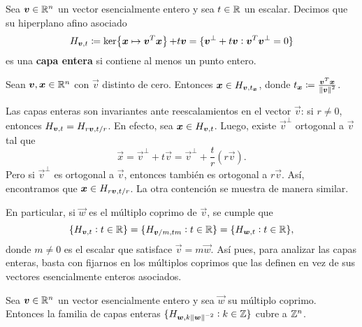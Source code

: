 \begin{definition}
	\label{phase-1:def:c-layer}
	Sea $\boldsymbol{v} \in \mathbb{R}^n$ un vector esencialmente entero y sea $t \in \mathbb{R}$ un escalar. Decimos que
	su hiperplano afino asociado
	\begin{equation}
		\label{phase-1:def:affine-hyperplane}
		H_{\boldsymbol{v}, t} \coloneq \mathop{\mathrm{ker}{\left\lbrace \boldsymbol{x} \mapsto \boldsymbol{v}^T\boldsymbol{x} \right\rbrace}} + t\boldsymbol{v}
		= \lbrace \boldsymbol{v}^{\perp} + t\boldsymbol{v} \vcentcolon \boldsymbol{v}^T\boldsymbol{v}^{\perp} = 0 \rbrace
	\end{equation}
	es una \textbf{capa entera} si contiene al menos un punto entero.
\end{definition}

\begin{lemma}
	\label{phase-1:lemma:layer}
	Sean $\boldsymbol{v}, \boldsymbol{x} \in \mathbb{R}^n$ con $\vec{v}$ distinto de cero. Entonces $\boldsymbol{x} \in
	H_{\boldsymbol{v}, t_{\boldsymbol{x}}}$, donde $t_{\boldsymbol{x}} \coloneq
	\frac{\boldsymbol{v}^T\boldsymbol{x}}{\left\lVert \boldsymbol{v} \right\rVert^2}$.
\end{lemma}

Las capas enteras son invariantes ante reescalamientos en el vector $\vec{v}$: si $r \neq 0$,
entonces $H_{\boldsymbol{v}, t} = H_{r\boldsymbol{v}, t/r}$. En efecto, sea $\boldsymbol{x} \in
H_{\boldsymbol{v}, t}$. Luego, existe $\vec{v}^\perp$ ortogonal a $\vec{v}$ tal que
\begin{equation*}
	\vec{x} = \vec{v}^\perp + t\vec{v} = \vec{v}^\perp + \frac{t}{r}(r\vec{v}).
\end{equation*}
Pero si $\vec{v}^\perp$ es ortogonal a $\vec{v}$, entonces también es ortogonal a $r\vec{v}$.
Así, encontramos que $\boldsymbol{x} \in H_{r\boldsymbol{v}, t/r}$. La otra contención se muestra de
manera similar.

En particular, si $\vec{w}$ es el múltiplo coprimo de $\vec{v}$, se cumple que
\begin{equation}
	\label{eq:clayer-eq}
	\lbrace H_{\boldsymbol{v}, t} \vcentcolon t \in \mathbb{R} \rbrace
	=
	\lbrace H_{\boldsymbol{v}/m, t m} \vcentcolon t \in \mathbb{R} \rbrace
	=
	\lbrace H_{\boldsymbol{w}, t} \vcentcolon t \in \mathbb{R} \rbrace,
\end{equation}
donde $m \neq 0$ es el escalar que satisface $\vec{v} = m\vec{w}$. Así pues, para analizar las capas
enteras, basta con fijarnos en los múltiplos coprimos que las definen en vez de sus vectores
esencialmente enteros asociados.

\begin{theorem}
	\label{phase-1:th:cover}
	Sea $\boldsymbol{v} \in \mathbb{R}^n$ un vector esencialmente entero y sea $\vec{w}$ su múltiplo coprimo.
	Entonces la familia de capas enteras $\lbrace H_{\boldsymbol{w}, k\left\lVert \boldsymbol{w} \right\rVert^{-2}} \vcentcolon k \in \mathbb{Z} \rbrace$ cubre a
	$\mathbb{Z}^n$.
\end{theorem}

